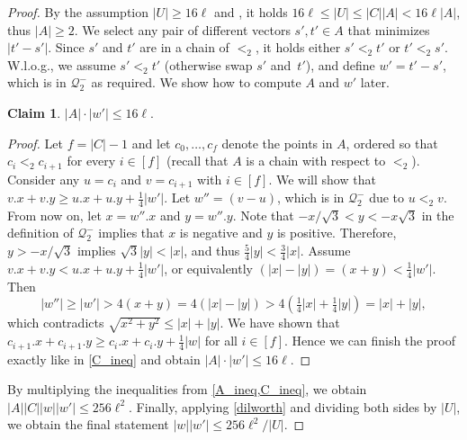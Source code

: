 \documentclass[11pt, letterpaper]{article}
\theoremstyle{plain}
\theoremstyle{definition}
\newtheorem{claim}{Claim}
\theoremstyle{remark}
\newcommand{\Q}{\mathcal{Q}}
\newcommand{\absolute}[1]{\left\lvert#1\right\rvert}
\begin{document}
\begin{proof}
By the assumption $\absolute{U} \ge 16\ell$ and , it holds
$16 \ell \le \absolute{U} \le \absolute{C} \absolute{A} < 16\ell\absolute{A}$,
thus $\absolute{A} \ge 2$.
We select any pair of different vectors $s', t' \in A$ that minimizes $\absolute{t' - s'}$. Since $s'$ and $t'$ are in a chain of $<_2$, it holds either $s' <_2 t'$ or $t' <_2 s'$. W.l.o.g., we assume $s' <_2 t'$ (otherwise swap $s'$ and~$t'$), and define $w' = t' - s'$, which is in $\Q_2^-$ as required.  We show how to compute $A$ and $w'$ later.

\begin{claim}\label{A_ineq}
	$\absolute{A}\cdot \absolute{w'} \leq 16\ell$. 
	\begin{proof}
	
		Let $f = \absolute{C} - 1$ and
		let $c_0, \dots, c_{f}$ denote the points in $A$, ordered so that $c_i <_2 c_{i + 1}$ for every $i \in [f]$ (recall that $A$ is a chain with respect to $<_2$).
		Consider any $u = c_i$ and $v = c_{i + 1}$ with $i \in [f]$. We will show that $v.x + v.y \geq u.x + u.y + \frac14\absolute{w'}$. 		
		Let $w'' = (v - u)$, which is in $\Q_2^-$ due to $u <_2 v$. From now on, let $x = w''.x$ and $y = w''.y$. 
		Note that $-x/\sqrt{3} < y < -x \sqrt{3}$ in the definition of $\Q_2^-$ implies that $x$ is negative and $y$ is positive.
		Therefore, $y > -x/\sqrt{3}$ implies $\sqrt{3}\absolute{y} < \absolute{x}$, and thus $\frac 5 4\absolute{y} < \frac 3 4\absolute{x}$.
		Assume $v.x + v.y < u.x + u.y + \frac14\absolute{w'}$, or equivalently $(\absolute{x} - \absolute{y}) = (x + y) < \frac14\absolute{w'}$. Then $$\absolute{w''} \geq \absolute{w'} > 4(x + y) = 4(\absolute{x} - \absolute{y}) > 4(\tfrac14\absolute{x} + \tfrac14\absolute{y}) = 
		\absolute{x} + \absolute{y},$$
		which contradicts $\sqrt{x^2 + y^2} \leq \absolute{x} + \absolute{y}$. We have shown that $c_{i + 1}.x + c_{i + 1}.y \geq c_i.x + c_i.y + \frac14\absolute{w}$ for all $i \in [f]$. Hence we can finish the proof exactly like in \cref{C_ineq} and obtain $\absolute{A}\cdot \absolute{w'} \leq 16\ell$.
	\end{proof}
\end{claim}

By multiplying the inequalities from \cref{A_ineq,C_ineq}, we obtain $\absolute{A}\absolute{C}\absolute{w}\absolute{w'} \leq 256\ell^2$. Finally, applying \cref{dilworth} and dividing both sides by $\absolute{U}$, we obtain the final statement $\absolute{w}\absolute{w'} \leq 256\ell^2/\absolute{U}$.


\end{proof}
\end{document}
